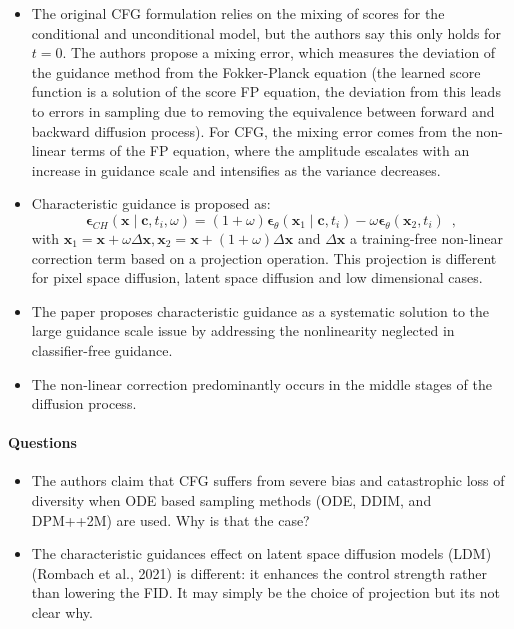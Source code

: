 \documentclass{article}
\begin{document}
\begin{itemize}
    \item The original CFG formulation relies on the mixing of scores for the conditional and unconditional model, but the authors say this only holds for $t=0$. The authors propose a mixing error, which measures the deviation of the guidance method from the Fokker-Planck equation (the learned score function is a solution of the score FP equation, the deviation from this leads to errors in sampling due to removing the equivalence between forward and backward diffusion process). For CFG, the mixing error comes from the non-linear terms of the FP equation, where the amplitude escalates with an increase in guidance scale and intensifies as the variance decreases.
    \item Characteristic guidance is proposed as:
    $$\boldsymbol{\epsilon}_{C H}\left(\mathbf{x} \mid \mathbf{c}, t_i, \omega\right)=(1+\omega) \boldsymbol{\epsilon}_\theta\left(\mathbf{x}_1 \mid \mathbf{c}, t_i\right)-\omega \boldsymbol{\epsilon}_\theta\left(\mathbf{x}_2, t_i\right)\enspace,$$ 
    with $\mathbf{x}_1=\mathbf{x}+\omega \Delta \mathbf{x}, \mathbf{x}_2=\mathbf{x}+(1+\omega) \Delta \mathbf{x}$ and $\Delta \mathbf{x}$ a training-free non-linear correction term based on a projection operation. This projection is different for pixel space diffusion, latent space diffusion and low dimensional cases.
    \item The paper proposes characteristic guidance as a systematic solution to the large guidance scale issue by addressing the nonlinearity neglected in classifier-free guidance.  
    \item The non-linear correction predominantly occurs in the middle stages of the diffusion process.
\end{itemize}

\paragraph{Questions}
\begin{itemize}
    \item The authors claim that CFG suffers from severe bias and catastrophic loss of diversity when ODE based sampling methods (ODE, DDIM, and DPM++2M) are used. Why is that the case?
    \item The characteristic guidances effect on latent space diffusion models (LDM) (Rombach et al., 2021) is different: it enhances the control strength rather than lowering the FID. It may simply be the choice of projection but its not clear why. 
\end{itemize}
\end{document}
